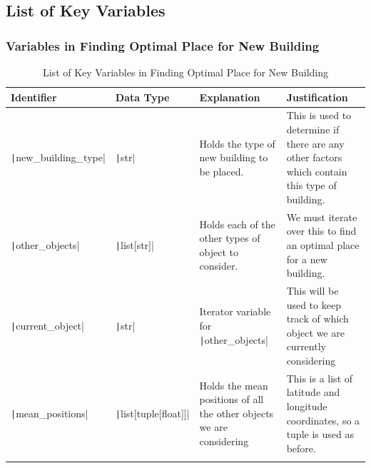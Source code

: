 \documentclass[12pt]{report}
\newcommand{\pil}[1]{\protect\texttt|#1|}
\begin{document}
\subsection{List of Key Variables}
\subsubsection{Variables in Finding Optimal Place for New Building}
\begin{center}
\begin{longtable}{ | m{3cm} | m{4cm}| m{4cm} | m{4cm} |} 
    \hline
    \textbf{Identifier} & \textbf{Data Type} & \textbf{Explanation}  & \textbf{Justification} \\ 
    \hline
    \pil{new_building_type} & \pil{str} & Holds the type of new building to be placed. & This is used to determine if there are any other factors which contain this type of building. \\ 
    \hline
    \pil{other_objects} & \pil{list[str]} & Holds each of the other types of object to consider. & We must iterate over this to find an optimal place for a new building. \\ 
    \hline
    \pil{current_object} & \pil{str} & Iterator variable for \pil{other_objects} & This will be used to keep track of which object we are currently considering \\ 
    \hline
    \pil{mean_positions} & \pil{list[tuple[float]]} & Holds the mean positions of all the other objects we are considering & This is a list of latitude and longitude coordinates, so a tuple is used as before. \\ 
    \hline
\caption{List of Key Variables in Finding Optimal Place for New Building}
\end{longtable}
\end{center}
\end{document}
